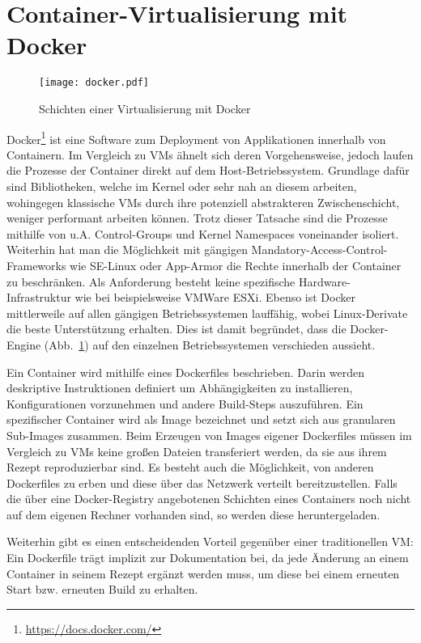 \section{Container-Virtualisierung mit Docker}
\begin{figure}
  \centering
  \texttt{[image: docker.pdf]}
  \par
  \caption{Schichten einer Virtualisierung mit Docker}
  \label{fig:layers-docker}
\end{figure}
Docker\footnote{\url{https://docs.docker.com/}} ist eine Software zum Deployment von Applikationen innerhalb von Containern.
Im Vergleich zu \acp{VM} ähnelt sich deren Vorgehensweise, jedoch laufen die Prozesse der Container direkt auf dem Host-Betriebssystem.
Grundlage dafür sind Bibliotheken, welche im Kernel oder sehr nah an diesem arbeiten, wohingegen klassische \acp{VM} durch ihre potenziell abstrakteren Zwischenschicht, weniger performant arbeiten können.
Trotz dieser Tatsache sind die Prozesse mithilfe von \ac{u.A.} Control-Groups und Kernel Namespaces voneinander isoliert.
Weiterhin hat man die Möglichkeit mit gängigen Mandatory-Access-Control-Frameworks wie SE-Linux oder App-Armor die Rechte innerhalb der Container zu beschränken.
Als Anforderung besteht keine spezifische Hardware-Infrastruktur wie bei beispielsweise VMWare ESXi.
Ebenso ist Docker mittlerweile auf allen gängigen Betriebssystemen lauffähig, wobei Linux-Derivate die beste Unterstützung erhalten.
Dies ist damit begründet, dass die Docker-Engine (\acs{Abb.}~\ref{fig:layers-docker}) auf den einzelnen Betriebssystemen verschieden aussieht.
\par
Ein Container wird mithilfe eines Dockerfiles beschrieben.
Darin werden deskriptive Instruktionen definiert um Abhängigkeiten zu installieren, Konfigurationen vorzunehmen und andere Build-Steps auszuführen.
Ein spezifischer Container wird als Image bezeichnet und setzt sich aus granularen Sub-Images zusammen.
Beim Erzeugen von Images eigener Dockerfiles müssen im Vergleich zu \acp{VM} keine großen Dateien transferiert werden, da sie aus ihrem Rezept reproduzierbar sind. 
Es besteht auch die Möglichkeit, von anderen Dockerfiles zu erben und diese über das Netzwerk verteilt bereitzustellen.
Falls die über eine Docker-Registry angebotenen Schichten eines Containers noch nicht auf dem eigenen Rechner vorhanden sind, so werden diese heruntergeladen.
\par
Weiterhin gibt es einen entscheidenden Vorteil gegenüber einer traditionellen \ac{VM}: Ein Dockerfile trägt implizit zur Dokumentation bei, da jede Änderung an einem Container in seinem Rezept ergänzt werden muss, um diese bei einem erneuten Start \ac{bzw.} erneuten Build zu erhalten.
